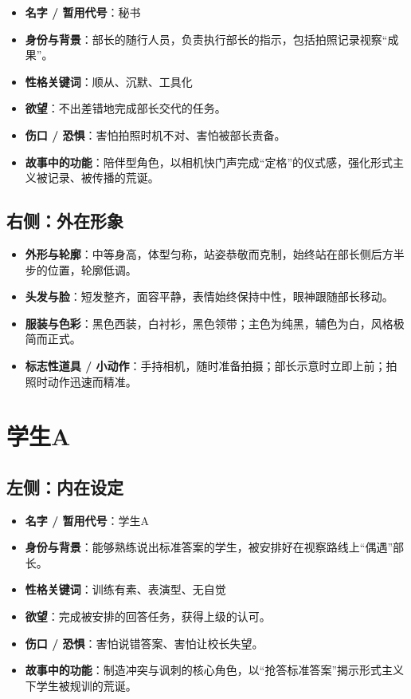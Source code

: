 \documentclass[11pt, a4paper]{article}
\begin{document}
	\begin{itemize}[leftmargin=2em, itemsep=0.2em]
		\item \textbf{名字 / 暂用代号}：秘书
		\item \textbf{身份与背景}：部长的随行人员，负责执行部长的指示，包括拍照记录视察“成果”。
		\item \textbf{性格关键词}：顺从、沉默、工具化
		\item \textbf{欲望}：不出差错地完成部长交代的任务。
		\item \textbf{伤口 / 恐惧}：害怕拍照时机不对、害怕被部长责备。
		\item \textbf{故事中的功能}：陪伴型角色，以相机快门声完成“定格”的仪式感，强化形式主义被记录、被传播的荒诞。
	\end{itemize}
	
	\subsection*{右侧：外在形象}
	
	\begin{itemize}[leftmargin=2em, itemsep=0.2em]
		\item \textbf{外形与轮廓}：中等身高，体型匀称，站姿恭敬而克制，始终站在部长侧后方半步的位置，轮廓低调。
		\item \textbf{头发与脸}：短发整齐，面容平静，表情始终保持中性，眼神跟随部长移动。
		\item \textbf{服装与色彩}：黑色西装，白衬衫，黑色领带；主色为纯黑，辅色为白，风格极简而正式。
		\item \textbf{标志性道具 / 小动作}：手持相机，随时准备拍摄；部长示意时立即上前；拍照时动作迅速而精准。
	\end{itemize}
	
	\newpage
	
	\section{学生A}
	
	\subsection*{左侧：内在设定}
	
	\begin{itemize}[leftmargin=2em, itemsep=0.2em]
		\item \textbf{名字 / 暂用代号}：学生A
		\item \textbf{身份与背景}：能够熟练说出标准答案的学生，被安排好在视察路线上“偶遇”部长。
		\item \textbf{性格关键词}：训练有素、表演型、无自觉
		\item \textbf{欲望}：完成被安排的回答任务，获得上级的认可。
		\item \textbf{伤口 / 恐惧}：害怕说错答案、害怕让校长失望。
		\item \textbf{故事中的功能}：制造冲突与讽刺的核心角色，以“抢答标准答案”揭示形式主义下学生被规训的荒诞。
	\end{itemize}
	
\end{document}
